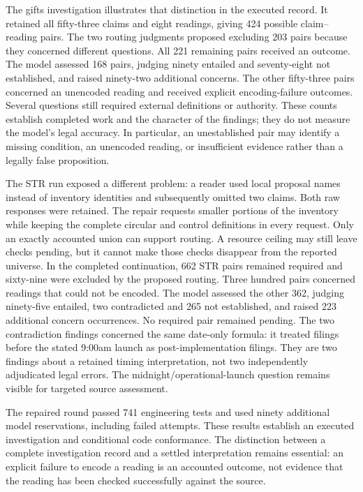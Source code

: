 The gifts investigation illustrates that distinction in the executed record.
It retained all fifty-three claims and eight readings, giving 424 possible
claim--reading pairs. The two routing judgments proposed excluding 203 pairs
because they concerned different questions. All 221 remaining pairs received an
outcome. The model assessed 168 pairs, judging ninety entailed and seventy-eight
not established, and raised ninety-two additional concerns. The other fifty-three
pairs concerned an unencoded reading and received explicit encoding-failure
outcomes. Several questions still required external definitions or
authority. These counts establish completed work and the character of the
findings; they do not measure the model's legal accuracy. In particular, an
unestablished pair may identify a missing condition, an unencoded reading, or
insufficient evidence rather than a legally false proposition.

The STR run exposed a different problem: a reader used local proposal names
instead of inventory identities and subsequently omitted two claims. Both raw
responses were retained. The repair requests smaller portions of the inventory
while keeping the complete circular and control definitions in every request.
Only an exactly accounted union can support routing. A resource ceiling may
still leave checks pending, but it cannot make those checks disappear from the
reported universe. In the completed continuation, 662 STR pairs remained
required and sixty-nine were excluded by the proposed routing. Three hundred
pairs concerned readings that could not be encoded. The model assessed the other
362, judging ninety-five entailed, two contradicted and 265 not established, and
raised 223 additional concern occurrences. No required pair remained pending.
The two contradiction findings concerned the same date-only formula: it treated
filings before the stated 9:00am launch as post-implementation filings. They are
two findings about a retained timing interpretation, not two independently
adjudicated legal errors. The midnight/operational-launch question remains
visible for targeted source assessment.

The repaired round passed 741 engineering tests and used ninety additional
model reservations, including failed attempts. These results establish an
executed investigation and conditional code conformance. The distinction between
a complete investigation record and a settled interpretation remains essential:
an explicit failure to encode a reading is an accounted outcome, not evidence
that the reading has been checked successfully against the source.
